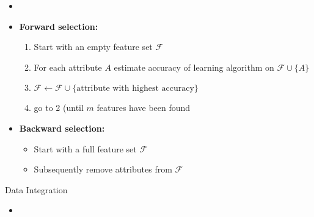 \begin{frame}
	\begin{itemize}
		\item 
	\end{itemize}
\end{frame}


\begin{frame}
\end{frame}


\begin{frame}
	\begin{itemize}
		\item \textbf{Forward selection:}
		\begin{enumerate}
			\item Start with an empty feature set $\mathcal{F}$
			\item For each attribute $A$ estimate accuracy of learning algorithm on $\mathcal{F} \cup \{ A \}$
			\item $\mathcal{F} \longleftarrow \mathcal{F} \cup \{ \text{attribute with highest accuracy} \}$
			\item go to 2 (until $m$ features have been found
		\end{enumerate}
		\item \textbf{Backward selection:}
		\begin{itemize}
			\item Start with a full feature set $\mathcal{F}$
			\item Subsequently remove attributes from $\mathcal{F}$
		\end{itemize}
	\end{itemize}
\end{frame}


\begin{dwHeaderFrame}{Data Integration}
	\begin{itemize}
		\item
	\end{itemize}
\end{dwHeaderFrame}


\makethanks


